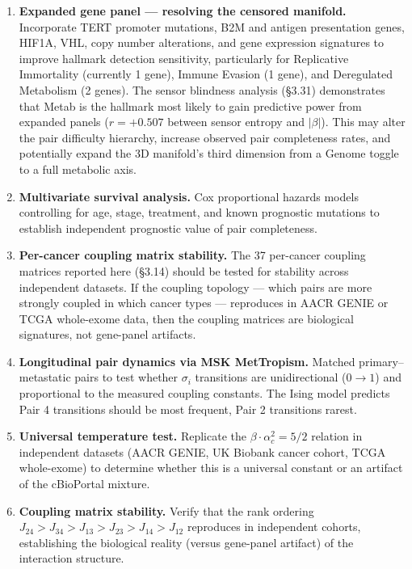 \documentclass[
  11pt,
]{article}
\providecommand{\tightlist}{%
  \setlength{\itemsep}{0pt}\setlength{\parskip}{0pt}}
\begin{document}
\begin{enumerate}
\def\labelenumi{\arabic{enumi}.}
\tightlist
\item
  \textbf{Expanded gene panel --- resolving the censored manifold.}
  Incorporate TERT promoter mutations, B2M and antigen presentation
  genes, HIF1A, VHL, copy number alterations, and gene expression
  signatures to improve hallmark detection sensitivity, particularly for
  Replicative Immortality (currently 1 gene), Immune Evasion (1 gene),
  and Deregulated Metabolism (2 genes). The sensor blindness analysis
  (§3.31) demonstrates that Metab is the hallmark most likely to gain
  predictive power from expanded panels (\(r = +0.507\) between sensor
  entropy and \(|\beta|\)). This may alter the pair difficulty
  hierarchy, increase observed pair completeness rates, and potentially
  expand the 3D manifold's third dimension from a Genome toggle to a
  full metabolic axis.
\item
  \textbf{Multivariate survival analysis.} Cox proportional hazards
  models controlling for age, stage, treatment, and known prognostic
  mutations to establish independent prognostic value of pair
  completeness.
\item
  \textbf{Per-cancer coupling matrix stability.} The 37 per-cancer
  coupling matrices reported here (§3.14) should be tested for stability
  across independent datasets. If the coupling topology --- which pairs
  are more strongly coupled in which cancer types --- reproduces in AACR
  GENIE or TCGA whole-exome data, then the coupling matrices are
  biological signatures, not gene-panel artifacts.
\item
  \textbf{Longitudinal pair dynamics via MSK MetTropism.} Matched
  primary--metastatic pairs to test whether \(\sigma_i\) transitions are
  unidirectional (\(0 \to 1\)) and proportional to the measured coupling
  constants. The Ising model predicts Pair 4 transitions should be most
  frequent, Pair 2 transitions rarest.
\item
  \textbf{Universal temperature test.} Replicate the
  \(\beta \cdot \alpha_c^2 = 5/2\) relation in independent datasets
  (AACR GENIE, UK Biobank cancer cohort, TCGA whole-exome) to determine
  whether this is a universal constant or an artifact of the cBioPortal
  mixture.
\item
  \textbf{Coupling matrix stability.} Verify that the rank ordering
  \(J_{24} > J_{34} > J_{13} > J_{23} > J_{14} > J_{12}\) reproduces in
  independent cohorts, establishing the biological reality (versus
  gene-panel artifact) of the interaction structure.

\end{enumerate}
\end{document}
